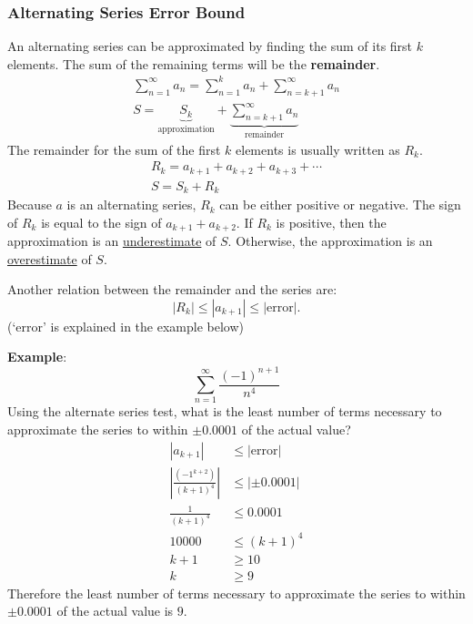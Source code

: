 \documentclass[12pt]{article}
\begin{document}
\subsubsection{Alternating Series Error Bound}
An alternating series can be approximated by finding the sum of its first $k$ elements. The sum of the remaining terms will be the \textbf{remainder}.
\begin{gather*}
    \sum_{n=1}^\infty a_n = \sum_{n=1}^k a_n + \sum_{n=k+1}^\infty a_n \\[10pt]
    S = \underbrace{S_k}_{\text{approximation}} + \underbrace{\sum_{n=k+1}^\infty a_n}_{\text{remainder}}
\end{gather*}
The remainder for the sum of the first $k$ elements is usually written as $R_k$.
\begin{gather*}
    R_k = a_{k+1} + a_{k+2} + a_{k+3} + \cdots \\
    S = S_k + R_k
\end{gather*}
Because $a$ is an alternating series, $R_k$ can be either positive or negative. The sign of $R_k$ is equal to the sign of $a_{k+1} + a_{k+2}$. If $R_k$ is positive, then the approximation is an \underline{underestimate} of $S$. Otherwise, the approximation is an \underline{overestimate} of $S$.

\noindent Another relation between the remainder and the series are:
\[ |R_k| \le |a_{k+1}| \le |\text{error}|. \]
(`error' is explained in the example below)

\noindent \textbf{Example}:
\[ \sum_{n=1}^\infty \frac{(-1)^{n+1}}{n^4} \]
Using the alternate series test, what is the least number of terms necessary to approximate the series to within $\pm 0.0001$ of the actual value?
\begin{align*}
    |a_{k+1}|                                 & \le |\text{error}| \\[6pt]
    \left| \frac{(-1^{k+2})}{(k+1)^4} \right| & \le |\pm 0.0001|   \\[6pt]
    \frac{1}{(k+1)^4}                         & \le 0.0001         \\[6pt]
    10000                                     & \le (k+1)^4        \\
    k+1                                       & \ge 10             \\
    k                                         & \ge 9
\end{align*}
Therefore the least number of terms necessary to approximate the series to within $\pm 0.0001$ of the actual value is $9$.
\end{document}
